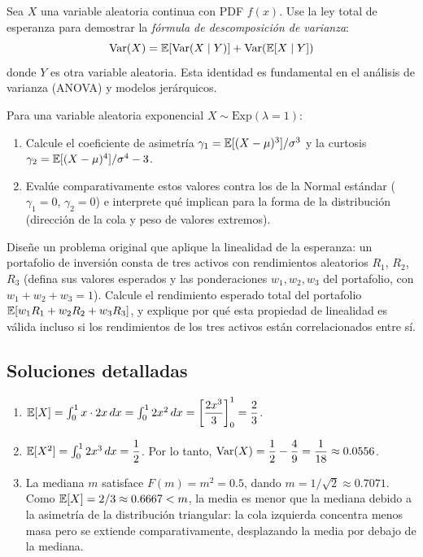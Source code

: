 \begin{problema}
	\label{prob:de8d740}
	Sea $X$ una variable aleatoria continua con PDF $f(x)$. Use la ley total de esperanza para demostrar la \emph{fórmula de descomposición de varianza}:
	$$\operatorname{Var}(X) = \mathbb{E}[\operatorname{Var}(X \mid Y)] + \operatorname{Var}(\mathbb{E}[X \mid Y])$$
	donde $Y$ es otra variable aleatoria. Esta identidad es fundamental en el análisis de varianza (ANOVA) y modelos jerárquicos.
\end{problema}

\begin{problema}
	\label{prob:9d4a41b}
	Para una variable aleatoria exponencial $X \sim \text{Exp}(\lambda = 1)$:
	\begin{enumerate}
		\item Calcule el coeficiente de asimetría $\gamma_{1} = \mathbb{E}[(X - \mu)^{3}]/\sigma^{3}$ y la curtosis $\gamma_{2} = \mathbb{E}[(X - \mu)^{4}]/\sigma^{4} - 3$.
		\item Evalúe comparativamente estos valores contra los de la Normal estándar ($\gamma_{1} = 0$, $\gamma_{2} = 0$) e interprete qué implican para la forma de la distribución (dirección de la cola y peso de valores extremos).
	\end{enumerate}
\end{problema}

\begin{problema}
	\label{prob:5c186f2}
	Diseñe un problema original que aplique la linealidad de la esperanza: un portafolio de inversión consta de tres activos con rendimientos aleatorios $R_1$, $R_2$, $R_3$ (defina sus valores esperados y las ponderaciones $w_1, w_2, w_3$ del portafolio, con $w_1+w_2+w_3=1$). Calcule el rendimiento esperado total del portafolio $\mathbb{E}[w_1R_1+w_2R_2+w_3R_3]$, y explique por qué esta propiedad de linealidad es válida incluso si los rendimientos de los tres activos están correlacionados entre sí.
\end{problema}

\subsection*{Soluciones detalladas}

\begin{solproblema}
	\begin{enumerate}
		\item $\mathbb{E}[X] = \int_{0}^{1} x \cdot 2x\,dx = \int_{0}^{1} 2x^{2}\,dx = \left[ \dfrac{2x^{3}}{3} \right]_{0}^{1} = \dfrac{2}{3}$.
		\item $\mathbb{E}[X^{2}] = \int_{0}^{1} 2x^{3}\,dx = \dfrac{1}{2}$. Por lo tanto, $\operatorname{Var}(X) = \dfrac{1}{2} - \dfrac{4}{9} = \dfrac{1}{18} \approx 0.0556$.
		\item La mediana $m$ satisface $F(m) = m^{2} = 0.5$, dando $m = 1/\sqrt{2} \approx 0.7071$. Como $\mathbb{E}[X] = 2/3 \approx 0.6667 < m$, la media es menor que la mediana debido a la asimetría de la distribución triangular: la cola izquierda concentra menos masa pero se extiende comparativamente, desplazando la media por debajo de la mediana.
	\end{enumerate}
\end{solproblema}

